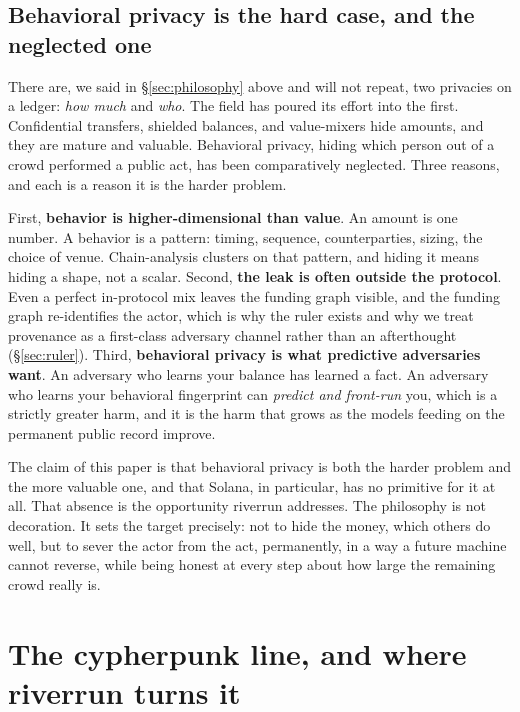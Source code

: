 \documentclass[11pt]{article}
\begin{document}
\subsection{Behavioral privacy is the hard case, and the neglected one}

There are, we said in \S\ref{sec:philosophy} above and will not repeat, two privacies on
a ledger: \emph{how much} and \emph{who}. The field has poured its effort into the
first. Confidential transfers, shielded balances, and value-mixers hide amounts, and
they are mature and valuable. Behavioral privacy, hiding which person out of a crowd
performed a public act, has been comparatively neglected. Three reasons, and each is a
reason it is the harder problem.

First, \textbf{behavior is higher-dimensional than value}. An amount is one number.
A behavior is a pattern: timing, sequence, counterparties, sizing, the choice of venue.
Chain-analysis clusters on that pattern, and hiding it means hiding a shape, not a
scalar. Second, \textbf{the leak is often outside the protocol}. Even a perfect
in-protocol mix leaves the funding graph visible, and the funding graph re-identifies the
actor, which is why the ruler exists and why we treat provenance as a first-class
adversary channel rather than an afterthought (\S\ref{sec:ruler}). Third,
\textbf{behavioral privacy is what predictive adversaries want}. An adversary who learns
your balance has learned a fact. An adversary who learns your behavioral fingerprint can
\emph{predict and front-run} you, which is a strictly greater harm, and it is the harm
that grows as the models feeding on the permanent public record improve.

The claim of this paper is that behavioral privacy is both the harder problem and the
more valuable one, and that Solana, in particular, has no primitive for it at all. That
absence is the opportunity riverrun addresses. The philosophy is not decoration. It sets
the target precisely: not to hide the money, which others do well, but to sever the actor
from the act, permanently, in a way a future machine cannot reverse, while being honest
at every step about how large the remaining crowd really is.

\section{The cypherpunk line, and where riverrun turns it}
\label{sec:cypherpunk}
\end{document}
